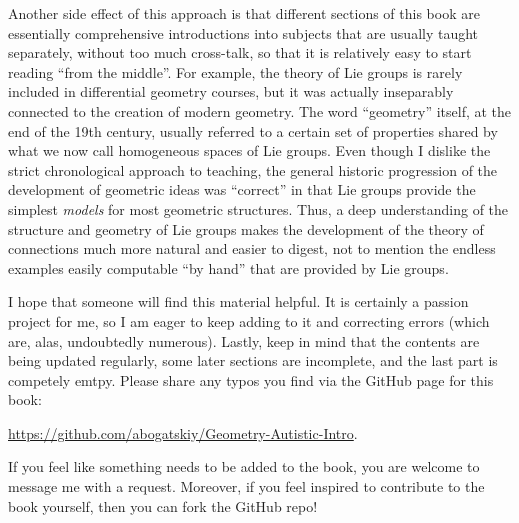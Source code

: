 Another side effect of this approach is that different sections of this book are essentially comprehensive introductions into subjects that are usually taught separately, without too much cross-talk, so that it is relatively easy to start reading ``from the middle''. For example, the theory of Lie groups is rarely included in differential geometry courses, but it was actually inseparably connected to the creation of modern geometry. The word ``geometry'' itself, at the end of the 19th century, usually referred to a certain set of properties shared by what we now call homogeneous spaces of Lie groups. Even though I dislike the strict chronological approach to teaching, the general historic progression of the development of geometric ideas was ``correct'' in that Lie groups provide the simplest \emph{models} for most  geometric structures. Thus, a deep understanding of the structure and geometry of Lie groups makes the development of the theory of connections much more natural and easier to digest, not to mention the endless examples easily computable ``by hand'' that are provided by Lie groups.

I hope that someone will find this material helpful. It is certainly a passion project for me, so I am eager to keep adding to it and correcting errors (which are, alas, undoubtedly numerous). Lastly, keep in mind that the contents are being updated regularly, some later sections are incomplete, and the last part is competely emtpy. Please share any typos you find via the GitHub page for this book:
\begin{center}
    \url{https://github.com/abogatskiy/Geometry-Autistic-Intro}.
\end{center}
If you feel like something needs to be added to the book, you are welcome to message me with a request. Moreover, if you feel inspired to contribute to the book yourself, then you can fork the GitHub repo!